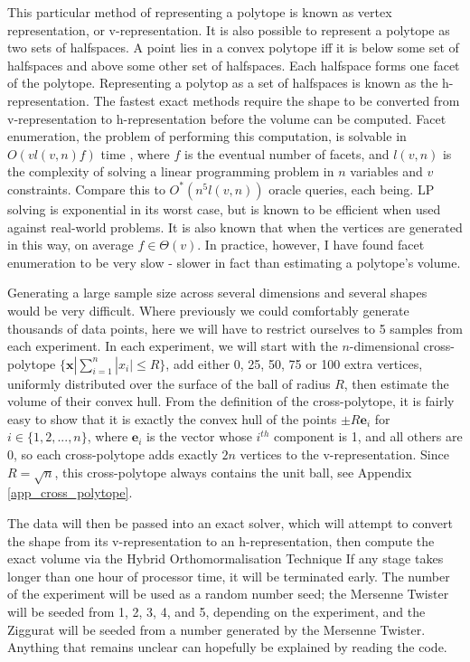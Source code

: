 This particular method of representing a polytope is known as vertex representation, or v-representation. It is also possible to represent a polytope as two sets of halfspaces. A point lies in a convex polytope iff it is below some set of halfspaces and above some other set of halfspaces. Each halfspace forms one facet of the polytope. Representing a polytop as a set of halfspaces is known as the h-representation. The fastest exact methods require the shape to be converted from v-representation to h-representation before the volume can be computed. Facet enumeration, the problem of performing this computation, is solvable in $O(vl(v,n)f)$ time %
, where $f$ is the eventual number of facets, and $l(v,n)$ is the complexity of solving a linear programming problem in $n$ variables and $v$ constraints. Compare this to $O^{*}(n^5l(v,n))$ oracle queries, each being. LP solving is exponential in its worst case,%
 but is known to be efficient when used against real-world problems. It is also known that when the vertices are generated in this way, on average $f \in \Theta(v)$. In practice, however, I have found facet enumeration to be very slow - slower in fact than estimating a polytope's volume.

Generating a large sample size across several dimensions and several shapes would be very difficult. Where previously we could comfortably generate thousands of data points, here we will have to restrict ourselves to 5 samples from each experiment. In each experiment, we will start with the $n$-dimensional cross-polytope $\{{\bm x} | \sum^n_{i=1}|x_i| \leqslant R\}$, add either 0, 25, 50, 75 or 100 extra vertices, uniformly distributed over the surface of the ball of radius $R$, then estimate the volume of their convex hull. From the definition of the cross-polytope, it is fairly easy to show that it is exactly the convex hull of the points $\pm R{\bm e}_i$ for $i \in \{1,2,...,n\}$, where ${\bm e}_i$ is the vector whose $i^{th}$ component is 1, and all others are 0, so each cross-polytope adds exactly $2n$ vertices to the v-representation. Since $R=\sqrt{n}$, this cross-polytope always contains the unit ball, see Appendix \ref{app_cross_polytope}.

The data will then be passed into an exact solver, which will attempt to convert the shape from its v-representation to an h-representation, then compute the exact volume via the Hybrid Orthomormalisation Technique %
If any stage takes longer than one hour of processor time, it will be terminated early. The number of the experiment will be used as a random number seed; the Mersenne Twister will be seeded from 1, 2, 3, 4, and 5, depending on the experiment, and the Ziggurat will be seeded from a number generated by the Mersenne Twister. Anything that remains unclear can hopefully be explained by reading the code. %


